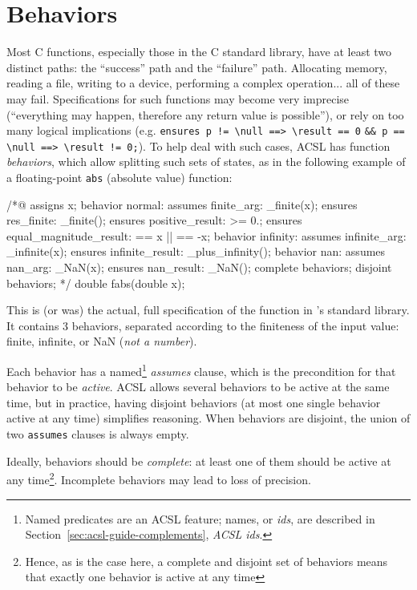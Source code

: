 \documentclass{frama-c-book}
\begin{document}
\section{Behaviors}

Most C functions, especially those in the C standard library, have at least
two distinct paths: the ``success'' path and the ``failure'' path.
Allocating memory, reading a file, writing to a device, performing a
complex operation... all of these may fail. Specifications for such functions
may become very imprecise (``everything may happen, therefore any return value
is possible''), or rely on too many logical implications (e.g.
\verb+ensures p != \null ==> \result == 0+ \verb+&& p == \null ==> \result != 0;+).
To help deal with such cases, ACSL has function {\em behaviors}, which allow
splitting such sets of states, as in the following example of a floating-point
\texttt{abs} (absolute value) function:

\begin{listing-nonumber}
/*@
  assigns \result \from x;
  behavior normal:
    assumes finite_arg: \is_finite(x);
    ensures res_finite: \is_finite(\result);
    ensures positive_result: \result >= 0.;
    ensures equal_magnitude_result: \result == x || \result == -x;
  behavior infinity:
    assumes infinite_arg: \is_infinite(x);
    ensures infinite_result: \is_plus_infinity(\result);
  behavior nan:
    assumes nan_arg: \is_NaN(x);
    ensures nan_result: \is_NaN(\result);
  complete behaviors;
  disjoint behaviors;
*/
double fabs(double x);
\end{listing-nonumber}

This is (or was) the actual, full specification of the function in \FramaC's
standard library. It contains 3 behaviors, separated according to the
finiteness of the input value: finite, infinite, or NaN ({\em not a number}).

Each behavior has a named\footnote{Named predicates are an ACSL feature; names,
or {\em ids}, are described in Section~\ref{sec:acsl-guide-complements},
{\em ACSL ids}.} {\em assumes} clause, which is the precondition for
that behavior to be {\em active}. ACSL allows several behaviors to be active
at the same time, but in practice, having disjoint behaviors (at most one single
behavior active at any time) simplifies reasoning. When behaviors are disjoint,
the union of two \texttt{assumes} clauses is always empty.

Ideally, behaviors should be {\em complete}: at least one of them should be
active at any time\footnote{Hence, as is the case here, a complete and disjoint set
of behaviors means that exactly one behavior is active at any time}.
Incomplete behaviors may lead to loss of precision.
\end{document}
